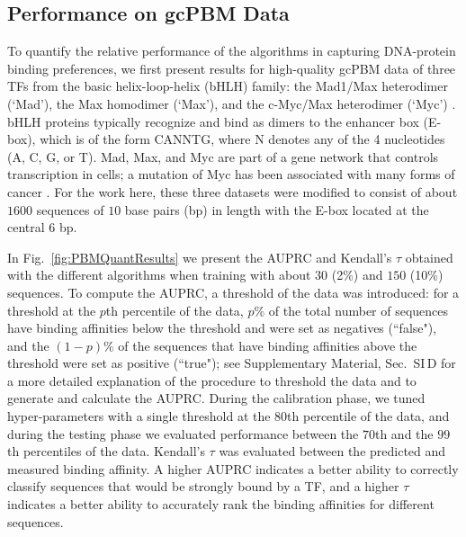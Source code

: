 \documentclass[aps,pra,groupedaddress,nofootinbib,notitlepage,showpacs,floatfix,superscriptaddress]{revtex4-1}
\begin{document}
\subsection*{Performance on gcPBM Data}
\label{sec:quantComp}

To quantify the relative performance of the algorithms in capturing DNA-protein binding preferences, we first present results for high-quality gcPBM \cite{Gordan:13} data of three TFs from the basic helix-loop-helix (bHLH) family: the Mad1/Max heterodimer (`Mad'), the Max homodimer (`Max'), and the c-Myc/Max heterodimer (`Myc') \cite{Zhou:15}. bHLH proteins typically recognize and bind as dimers to the enhancer box (E-box), which is of the form CANNTG, where N denotes any of the 4 nucleotides (A, C, G, or T). Mad, Max, and Myc are part of a gene network that controls transcription in cells; a mutation of Myc has been associated with many forms of cancer \cite{Grandori:00}. For the work here, these three datasets were modified to consist of about $1600$ sequences of $10$ base pairs (bp) in length with the E-box located at the central 6 bp.

In Fig.~\ref{fig:PBMQuantResults} we present the AUPRC and Kendall's $\tau$ obtained with the different algorithms when training with about $30$ (2\%) and $150$ (10\%) sequences. To compute the AUPRC, a threshold of the data was introduced: for a threshold at the $p$th percentile of the data, $p\%$ of the total number of sequences have binding affinities below the threshold and were set as negatives (``false"), and the $(1-p)\%$ of the sequences that have binding affinities above the threshold were set as positive (``true"); see Supplementary Material, Sec.~SI\,D for a more detailed explanation of the procedure to threshold the data and to generate and calculate the AUPRC. During the calibration phase, we tuned hyper-parameters with a single threshold at the $80$th percentile of the data, and during the testing phase we evaluated performance between the $70$th and the $99$th percentiles of the data. Kendall's $\tau$ was evaluated between the predicted  and measured binding affinity. A higher AUPRC indicates a better ability to correctly classify sequences that would be strongly bound by a TF, and a higher $\tau$ indicates a better ability to accurately rank the binding affinities for different sequences. 
\end{document}
